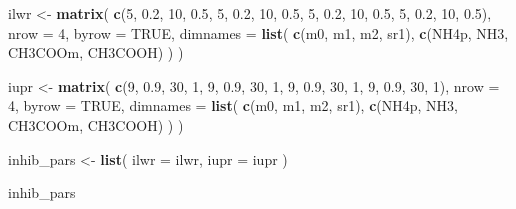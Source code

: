\documentclass[
]{article}
\newenvironment{Shaded}{\begin{snugshade}}{\end{snugshade}}
\newcommand{\AttributeTok}[1]{\textcolor[rgb]{0.13,0.29,0.53}{#1}}
\newcommand{\ConstantTok}[1]{\textcolor[rgb]{0.56,0.35,0.01}{#1}}
\newcommand{\DecValTok}[1]{\textcolor[rgb]{0.00,0.00,0.81}{#1}}
\newcommand{\FloatTok}[1]{\textcolor[rgb]{0.00,0.00,0.81}{#1}}
\newcommand{\FunctionTok}[1]{\textcolor[rgb]{0.13,0.29,0.53}{\textbf{#1}}}
\newcommand{\NormalTok}[1]{#1}
\newcommand{\OtherTok}[1]{\textcolor[rgb]{0.56,0.35,0.01}{#1}}
\newcommand{\StringTok}[1]{\textcolor[rgb]{0.31,0.60,0.02}{#1}}
\begin{document}
\begin{Shaded}
\begin{Highlighting}[]
\NormalTok{ilwr }\OtherTok{\textless{}{-}} \FunctionTok{matrix}\NormalTok{(}
  \FunctionTok{c}\NormalTok{(}\DecValTok{5}\NormalTok{, }\FloatTok{0.2}\NormalTok{, }\DecValTok{10}\NormalTok{, }\FloatTok{0.5}\NormalTok{,}
    \DecValTok{5}\NormalTok{, }\FloatTok{0.2}\NormalTok{, }\DecValTok{10}\NormalTok{, }\FloatTok{0.5}\NormalTok{,}
    \DecValTok{5}\NormalTok{, }\FloatTok{0.2}\NormalTok{, }\DecValTok{10}\NormalTok{, }\FloatTok{0.5}\NormalTok{,}
    \DecValTok{5}\NormalTok{, }\FloatTok{0.2}\NormalTok{, }\DecValTok{10}\NormalTok{, }\FloatTok{0.5}\NormalTok{),}
  \AttributeTok{nrow =} \DecValTok{4}\NormalTok{,}
  \AttributeTok{byrow =} \ConstantTok{TRUE}\NormalTok{,}
  \AttributeTok{dimnames =} \FunctionTok{list}\NormalTok{(}
    \FunctionTok{c}\NormalTok{(}\StringTok{\textquotesingle{}m0\textquotesingle{}}\NormalTok{, }\StringTok{\textquotesingle{}m1\textquotesingle{}}\NormalTok{, }\StringTok{\textquotesingle{}m2\textquotesingle{}}\NormalTok{, }\StringTok{\textquotesingle{}sr1\textquotesingle{}}\NormalTok{),}
    \FunctionTok{c}\NormalTok{(}\StringTok{\textquotesingle{}NH4p\textquotesingle{}}\NormalTok{, }\StringTok{\textquotesingle{}NH3\textquotesingle{}}\NormalTok{, }\StringTok{\textquotesingle{}CH3COOm\textquotesingle{}}\NormalTok{, }\StringTok{\textquotesingle{}CH3COOH\textquotesingle{}}\NormalTok{)}
\NormalTok{  )}
\NormalTok{)}

\NormalTok{iupr }\OtherTok{\textless{}{-}} \FunctionTok{matrix}\NormalTok{(}
  \FunctionTok{c}\NormalTok{(}\DecValTok{9}\NormalTok{, }\FloatTok{0.9}\NormalTok{, }\DecValTok{30}\NormalTok{, }\DecValTok{1}\NormalTok{,}
    \DecValTok{9}\NormalTok{, }\FloatTok{0.9}\NormalTok{, }\DecValTok{30}\NormalTok{, }\DecValTok{1}\NormalTok{,}
    \DecValTok{9}\NormalTok{, }\FloatTok{0.9}\NormalTok{, }\DecValTok{30}\NormalTok{, }\DecValTok{1}\NormalTok{,}
    \DecValTok{9}\NormalTok{, }\FloatTok{0.9}\NormalTok{, }\DecValTok{30}\NormalTok{, }\DecValTok{1}\NormalTok{),}
  \AttributeTok{nrow =} \DecValTok{4}\NormalTok{,}
  \AttributeTok{byrow =} \ConstantTok{TRUE}\NormalTok{,}
  \AttributeTok{dimnames =} \FunctionTok{list}\NormalTok{(}
    \FunctionTok{c}\NormalTok{(}\StringTok{\textquotesingle{}m0\textquotesingle{}}\NormalTok{, }\StringTok{\textquotesingle{}m1\textquotesingle{}}\NormalTok{, }\StringTok{\textquotesingle{}m2\textquotesingle{}}\NormalTok{, }\StringTok{\textquotesingle{}sr1\textquotesingle{}}\NormalTok{),}
    \FunctionTok{c}\NormalTok{(}\StringTok{\textquotesingle{}NH4p\textquotesingle{}}\NormalTok{, }\StringTok{\textquotesingle{}NH3\textquotesingle{}}\NormalTok{, }\StringTok{\textquotesingle{}CH3COOm\textquotesingle{}}\NormalTok{, }\StringTok{\textquotesingle{}CH3COOH\textquotesingle{}}\NormalTok{)}
\NormalTok{  )}
\NormalTok{)}

\NormalTok{inhib\_pars }\OtherTok{\textless{}{-}} \FunctionTok{list}\NormalTok{(}
  \AttributeTok{ilwr =}\NormalTok{ ilwr,}
  \AttributeTok{iupr =}\NormalTok{ iupr}
\NormalTok{)}

\NormalTok{inhib\_pars}
\end{Highlighting}
\end{Shaded}
\end{document}
